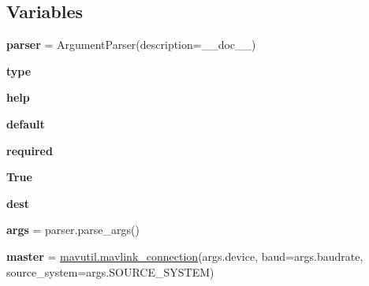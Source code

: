 \subsection*{Variables}
\begin{DoxyCompactItemize}
\item 
\mbox{\label{namespacepymavlink_1_1examples_1_1mavtester_abaf020d3f161e1f0172b14362f3d36f5}} 
{\bfseries parser} = Argument\+Parser(description=\+\_\+\+\_\+doc\+\_\+\+\_\+)
\item 
\mbox{\label{namespacepymavlink_1_1examples_1_1mavtester_a85d6cc5180b6d3cf95f36b44a8dcf832}} 
{\bfseries type}
\item 
\mbox{\label{namespacepymavlink_1_1examples_1_1mavtester_ad6f1c83a2b98289aa750e955f0e05278}} 
{\bfseries help}
\item 
\mbox{\label{namespacepymavlink_1_1examples_1_1mavtester_a9e36618a8bea3b749799ac0f0dcf9748}} 
{\bfseries default}
\item 
\mbox{\label{namespacepymavlink_1_1examples_1_1mavtester_a8816d6500a50df4c5fc9a43197b27bc9}} 
{\bfseries required}
\item 
\mbox{\label{namespacepymavlink_1_1examples_1_1mavtester_af775e6d2c46f681aea052a01b4c1ccd1}} 
{\bfseries True}
\item 
\mbox{\label{namespacepymavlink_1_1examples_1_1mavtester_a61af7b708b0fd522f5830193b5941d68}} 
{\bfseries dest}
\item 
\mbox{\label{namespacepymavlink_1_1examples_1_1mavtester_aaac9e510d5e48381c651f2742fa7cf15}} 
{\bfseries args} = parser.\+parse\+\_\+args()
\item 
\mbox{\label{namespacepymavlink_1_1examples_1_1mavtester_a8d0f4641fe2b543e3064e11246fbea32}} 
{\bfseries master} = \hyperlink{namespacepymavlink_1_1mavutil_a021b0a1b1d488c0800662acaef819852}{mavutil.\+mavlink\+\_\+connection}(args.\+device, baud=args.\+baudrate, source\+\_\+system=args.\+S\+O\+U\+R\+C\+E\+\_\+\+S\+Y\+S\+T\+EM)
\end{DoxyCompactItemize}


